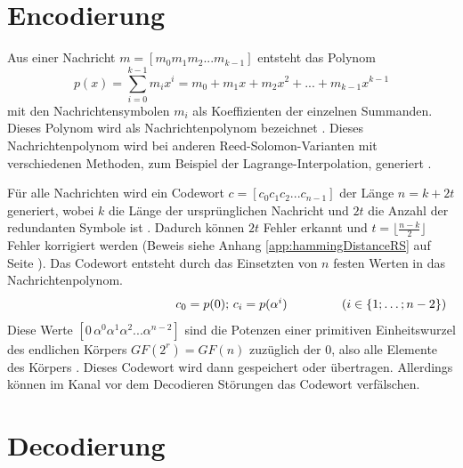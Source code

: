 \section{Encodierung}\label{sec:encoding}

Aus einer Nachricht  $m=[m_{0}m_{1}m_{2}...m_{k-1}]$ entsteht das Polynom \[p(x)=\sum_{i=0}^{k-1}m_ix^i=m_0+m_1x+m_2x^2+...+m_{k-1}x^{k-1}\] mit den Nachrichtensymbolen $m_i$ als Koeffizienten der einzelnen Summanden.
Dieses Polynom wird  als Nachrichtenpolynom bezeichnet \cite{reedPolynomialCodesCertain1960}.
Dieses Nachrichtenpolynom wird bei anderen Reed-Solomon-Varianten mit verschiedenen Methoden, zum Beispiel der Lagrange-Interpolation, generiert \cite{wendlingIntroductionReedSolomon2017}.

Für alle Nachrichten wird ein Codewort $c=[c_{0}c_{1}c_{2}...c_{n-1}]$ der Länge $n=k+2t$ generiert, wobei $k$ die Länge der ursprünglichen Nachricht und $2t$ die Anzahl der redundanten Symbole ist \cite{verbeureReedSolomonErrorCorrecting2022}. 
Dadurch können $2t$ Fehler erkannt und $t=\lfloor\frac{n-k}{2}\rfloor$ Fehler korrigiert werden (Beweis siehe Anhang \ref{app:hammingDistanceRS} auf Seite \pageref{app:hammingDistanceRS}).
Das Codewort entsteht durch das Einsetzten von $n$ festen Werten in das Nachrichtenpolynom.
\[
\makebox[\linewidth]{%
	\hfill
	$c_0=p(0);\,c_i=p(\alpha^i)$\hfill
	\llap{($i\in\{1;\dots;n-2\}$)}%
}
\]
Diese Werte $[0\,\alpha^0 \alpha^1 \alpha^2...\alpha^{n-2}]$ sind die Potenzen einer primitiven Einheitswurzel des endlichen Körpers $GF(2^r)=GF(n)$ zuzüglich der 0, also alle Elemente des Körpers \cite{weitzKonkreteMathematikNicht2021}.
Dieses Codewort wird dann gespeichert oder übertragen.
Allerdings können im Kanal vor dem Decodieren Störungen das Codewort verfälschen.

\section{Decodierung}\label{sec:decoding}

